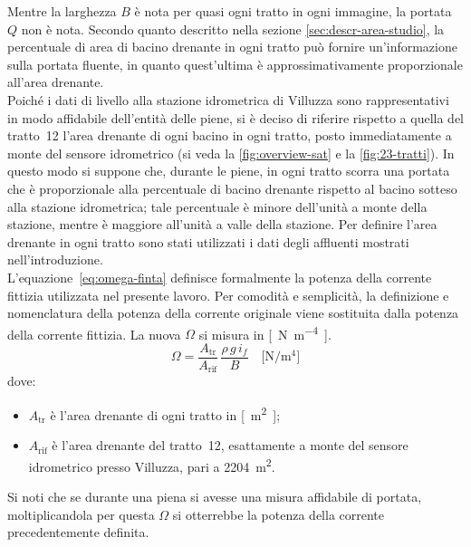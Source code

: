 Mentre la larghezza $B$ è nota per quasi ogni tratto in ogni immagine, la portata $Q$ non è nota.
Secondo quanto descritto nella sezione \ref{sec:descr-area-studio}, la percentuale di area di bacino drenante in ogni tratto può fornire un'informazione sulla portata fluente, in quanto quest'ultima è approssimativamente proporzionale all'area drenante.
\\
Poiché i dati di livello alla stazione idrometrica di Villuzza sono rappresentativi in modo affidabile dell'entità delle piene, si è deciso di riferire rispetto a quella del tratto~12 l'area drenante di ogni bacino in ogni tratto, posto immediatamente a monte del sensore idrometrico (si veda la \cref{fig:overview-sat} e la \cref{fig:23-tratti}).
In questo modo si suppone che, durante le piene, in ogni tratto scorra una portata che è proporzionale alla percentuale di bacino drenante rispetto al bacino sotteso alla stazione idrometrica; tale percentuale è minore dell’unità a monte della stazione, mentre è maggiore all’unità a valle della stazione.
Per definire l’area drenante in ogni tratto sono stati utilizzati i dati degli affluenti mostrati nell’introduzione.
\\
L'equazione~\eqref{eq:omega-finta} definisce formalmente la potenza della corrente fittizia utilizzata nel presente lavoro.
Per comodità e semplicità, la definizione e nomenclatura della potenza della corrente originale viene sostituita dalla potenza della corrente fittizia.
La nuova $\Omega$ si misura in \si{[\newton\per\m\tothe{4}]}.
%
\begin{equation}
	\label{eq:omega-finta}
	\Omega = \frac{A_\mathrm{tr}}{A_\mathrm{rif}} \, \frac{\rho \, g \, i_f}{B}	
	\quad
	\si{[\newton\per\m\tothe{4}]} 
\end{equation}
%
dove:
%
\begin{itemize}
	\item $A_\mathrm{tr}$ è l'area drenante di ogni tratto in \si{[\m\tothe{2}]};
	\item $A_\mathrm{rif}$ è l'area drenante del tratto~12, esattamente a monte del sensore idrometrico presso Villuzza, pari a \SI{2204}{\m\tothe{2}}.
\end{itemize}
%
Si noti che se durante una piena si avesse una misura affidabile di portata, moltiplicandola per questa $\Omega$ si otterrebbe la potenza della corrente precedentemente definita.

